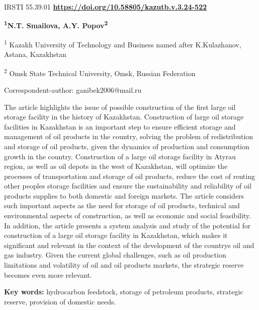 \newpage
IRSTI 55.39.01
\hfill {\bfseries \href{https://doi.org/10.58805/kazutb.v.3.24-522}{https://doi.org/10.58805/kazutb.v.3.24-522}}


\begin{center}
{\bfseries \textsuperscript{1}N.T. Smailova\envelope, A.Y.
Popov\textsuperscript{2}}

\textsuperscript{1} Kazakh University of Technology and Business named
after K.Kulazhanov, Astana, Kazakhstan

\textsuperscript{2} Omsk State Technical University, Omsk, Russian
Federation

\envelope Correspondent-author: ganibek2006@mail.ru
\end{center}

The article highlights the issue of possible construction of the first
large oil storage facility in the history of Kazakhstan. Construction of
large oil storage facilities in Kazakhstan is an important step to
ensure efficient storage and management of oil products in the country,
solving the problem of redistribution and storage of oil products, given
the dynamics of production and consumption growth in the country.
Construction of a large oil storage facility in Atyrau region, as well
as oil depots in the west of Kazakhstan, will optimize the processes of
transportation and storage of oil products, reduce the cost of renting
other people\textquotesingle s storage facilities and ensure the
sustainability and reliability of oil products supplies to both domestic
and foreign markets. The article considers such important aspects as the
need for storage of oil products, technical and environmental aspects of
construction, as well as economic and social feasibility. In addition,
the article presents a system analysis and study of the potential for
construction of a large oil storage facility in Kazakhstan, which makes
it significant and relevant in the context of the development of the
country\textquotesingle s oil and gas industry. Given the current global
challenges, such as oil production limitations and volatility of oil and
oil products markets, the strategic reserve becomes even more relevant.

{\bfseries Key words:} hydrocarbon feedstock, storage of petroleum
products, strategic reserve, provision of domestic needs.


